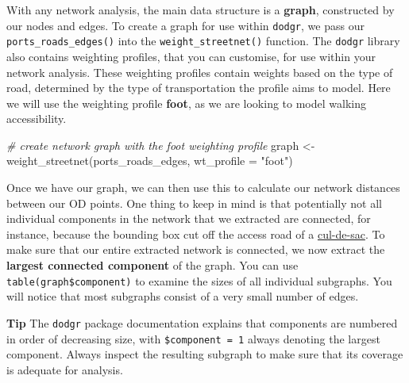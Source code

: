 \documentclass[
]{book}
\newenvironment{Shaded}{\begin{snugshade}}{\end{snugshade}}
\newcommand{\AttributeTok}[1]{\textcolor[rgb]{0.77,0.63,0.00}{#1}}
\newcommand{\CommentTok}[1]{\textcolor[rgb]{0.56,0.35,0.01}{\textit{#1}}}
\newcommand{\DecValTok}[1]{\textcolor[rgb]{0.00,0.00,0.81}{#1}}
\newcommand{\FunctionTok}[1]{\textcolor[rgb]{0.00,0.00,0.00}{#1}}
\newcommand{\NormalTok}[1]{#1}
\newcommand{\OtherTok}[1]{\textcolor[rgb]{0.56,0.35,0.01}{#1}}
\newcommand{\SpecialCharTok}[1]{\textcolor[rgb]{0.00,0.00,0.00}{#1}}
\newcommand{\StringTok}[1]{\textcolor[rgb]{0.31,0.60,0.02}{#1}}
\begin{document}
With any network analysis, the main data structure is a \textbf{graph}, constructed by our nodes and edges. To create a graph for use within \texttt{dodgr}, we pass our \texttt{ports\_roads\_edges()} into the \texttt{weight\_streetnet()} function. The \texttt{dodgr} library also contains weighting profiles, that you can customise, for use within your network analysis. These weighting profiles contain weights based on the type of road, determined by the type of transportation the profile aims to model. Here we will use the weighting profile \textbf{foot}, as we are looking to model walking accessibility.

\begin{Shaded}
\begin{Highlighting}[]
\CommentTok{\# create network graph with the foot weighting profile}
\NormalTok{graph }\OtherTok{\textless{}{-}} \FunctionTok{weight\_streetnet}\NormalTok{(ports\_roads\_edges, }\AttributeTok{wt\_profile =} \StringTok{"foot"}\NormalTok{)}
\end{Highlighting}
\end{Shaded}

Once we have our graph, we can then use this to calculate our network distances between our OD points. One thing to keep in mind is that potentially not all individual components in the network that we extracted are connected, for instance, because the bounding box cut off the access road of a \href{https://en.wikipedia.org/wiki/Dead_end_(street)}{cul-de-sac}. To make sure that our entire extracted network is connected, we now extract the \textbf{largest connected component} of the graph. You can use \texttt{table(graph\$component)} to examine the sizes of all individual subgraphs. You will notice that most subgraphs consist of a very small number of edges.

\textbf{Tip}
The \texttt{dodgr} package documentation explains that components are numbered in order of decreasing size, with \texttt{\$component\ =\ 1} always denoting the largest component. Always inspect the resulting subgraph to make sure that its coverage is adequate for analysis.

\begin{Shaded}
\end{Shaded}
\end{document}
